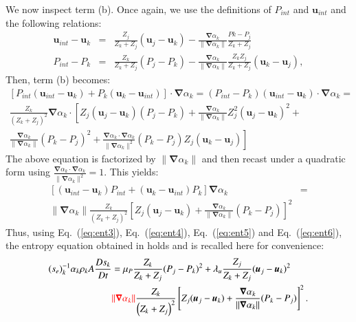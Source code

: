 \documentclass[preprint,10pt]{elsarticle}
\newcommand{\grad}{\mbold{\nabla}}
\newcommand{\mbold}[1]{\boldsymbol#1}
\newcommand{\eqt}[1]{Eq.~(\ref{#1})}                     %
\newcommand{\tcr}[1]{\textcolor{red}{#1}}
\begin{document}
\begin{appendices}
We now inspect term (b). Once again, we use the definitions of $P_{int}$ and $\mbold u_{int}$ and the following relations:
\begin{eqnarray}
\label{eq:ent4bis}
\mbold u_{int}-\mbold u_k &=& \frac{Z_j}{Z_k+Z_j}(\mbold u_j-\mbold u_k) -  \frac{\grad \alpha_k}{\| \grad \alpha_k \|} \frac{Pk-P_j}{Z_k+Z_j} \nonumber\\
P_{int}-P_k &=& \frac{Z_k}{Z_k+Z_j} (P_j-P_k) - \frac{\grad \alpha_k}{\| \grad \alpha_k \|} \frac{Z_k Z_j}{Z_k+Z_j} (\mbold u_k-\mbold u_j), \nonumber 
\end{eqnarray}
Then, term (b) becomes:
\begin{eqnarray}
\label{eq:ent5}
\left[ P_{int} (\mbold u_{int}-\mbold u_k) + P_k (\mbold u_k-\mbold u_{int}) \right] \cdot \grad \alpha_k = (P_{int}-P_k)(\mbold u_{int}-\mbold u_k)\cdot \grad \alpha_k=  \nonumber\\ 
\frac{Z_k}{\left( Z_k+Z_j \right)^2} \grad \alpha_k \cdot \left[ Z_j (\mbold u_j-\mbold u_k)(P_j-P_k)+\frac{\grad \alpha_k}{\| \grad \alpha_k \|} Z_j^2 (\mbold u_j-\mbold u_k)^2 \right. + \nonumber \\ 
\left. \frac{\grad \alpha_k}{\| \grad \alpha_k \|}(P_k-P_j)^2 +  \frac{\grad \alpha_k \cdot \grad \alpha_k}{\| \grad \alpha_k \|^2}(P_k-P_j)Z_j (\mbold u_k-\mbold u_j) \right] 
\end{eqnarray}
The above equation is factorized by $\|  \grad \alpha_k \|$ and then recast under a quadratic form using $\frac{\grad \alpha_k \cdot \grad \alpha_k}{\| \grad \alpha_k \|^2} = 1$. This yields:
\begin{align}
\label{eq:ent6}
\left[ (\mbold u_{int}-\mbold u_k)P_{int} + (\mbold u_k-\mbold u_{int})P_k \right] \grad \alpha_k &=  \nonumber \\
\| \grad \alpha_k \| \frac{Z_k }{\left( Z_k+Z_j \right)^2} \left[ Z_j (\mbold u_j-\mbold u_k) + \frac{\grad \alpha_k}{\| \grad \alpha_k \|}(P_k-P_j)\right]^2
\end{align}
Thus, using \eqt{eq:ent3}, \eqt{eq:ent4}, \eqt{eq:ent5} and \eqt{eq:ent6}, the entropy equation obtained in \cite{SEM} holds and is recalled here for convenience:
\begin{align}
(s_{e})_k^{-1} \alpha_k \rho_k A \frac{Ds_k}{Dt} &= \mu_P \frac{Z_k}{Z_k+Z_j} (P_j - P_k)^2 + \lambda_u \frac{Z_j}{Z_k+Z_j} (\mbold u_j -\mbold  u_k)^2 \nonumber
\\
& \tcr{\| \grad \alpha_k \|} \frac{Z_k}{\left( Z_k+Z_j \right)^2} \left[ Z_j (\mbold u_j-\mbold u_k)+\frac{\grad \alpha_k}{\| \grad \alpha_k \|}(P_k-P_j)\right]^2. \nonumber
\end{align}


\end{appendices}
\end{document}
